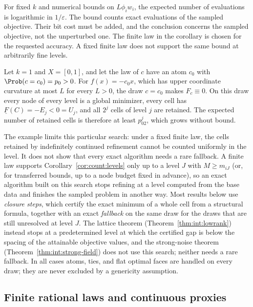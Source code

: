 For fixed $k$ and numerical bounds on $L\phi_iw_i$, the expected number of
evaluations is logarithmic in $1/\varepsilon$. The bound counts exact
evaluations of the sampled objective. Their bit cost must be added, and the
conclusion concerns the sampled objective, not the unperturbed one. The
finite law in the corollary is chosen for the requested accuracy. A fixed
finite law does not support the same bound at arbitrarily fine levels.

\begin{example}\label{ex:count:atom}
Let $k=1$ and $X=[0,1]$, and let the law of $c$ have an atom $c_0$ with
$\Prob(c=c_0)=p_0>0$. For $f(x)=-c_0x$, which has upper coordinate curvature at
most $L$ for every $L>0$, the draw $c=c_0$ makes $F_c\equiv0$. On this draw every node
of every level is a global minimizer, every cell has
$\underline F(C)=-E_j<0=U_j$, and all $2^j$ cells of level $j$ are retained.
The expected number of retained cells is therefore at least $p_02^j$, which
grows without bound.
\end{example}

The example limits this particular search: under a fixed finite law, the
cells retained by indefinitely continued refinement cannot be counted
uniformly in the level. It does not show that every exact algorithm needs a
rare fallback. A finite law supports Corollary~\ref{cor:count:levels} only up
to a level $J$ with $M\ge m_{iJ}$ (or, for transferred bounds, up to a node
budget fixed in advance), so an exact algorithm built on this search stops
refining at a level computed from the base data and finishes the sampled
problem in another way. Most results below use \emph{closure steps}, which
certify the exact minimum of a whole cell from a structural formula,
together with an exact \emph{fallback} on the same draw for the draws that
are still unresolved at level $J$. The lattice theorem
(Theorem~\ref{thm:int:lowrank}) instead stops at a predetermined level at
which the certified gap is below the spacing of the attainable objective
values, and the strong-noise theorem (Theorem~\ref{thm:int:strong-field})
does not use this search; neither needs a rare fallback. In all cases atoms,
ties, and flat optimal faces are handled on every draw; they are never
excluded by a genericity assumption.

\subsection{Finite rational laws and continuous proxies}\label{sec:count:laws}

